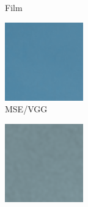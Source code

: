 \begin{figure}
\begin{subfigure}[t]{.19\textwidth}
        \captionsetup{justification=centering}
        \caption{Film}
      \end{subfigure}
    \hfill
    \begin{subfigure}[t]{.19\textwidth}
        \centering
        \includegraphics[width=\linewidth]{figures/mse-vgg-noise-resize-sky.png}
        \captionsetup{justification=centering}
        \caption{MSE/VGG}
      \end{subfigure}
    \hfill
    \begin{subfigure}[t]{.19\textwidth}
        \centering
        \includegraphics[width=\linewidth]{figures/mse-vgg-tev-rel-sky.png}

\end{subfigure}
\end{figure}
